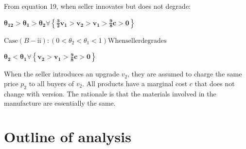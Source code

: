 \documentclass{article}
\begin{document}
From equation 19, when seller innovates but does not degrade: 

\begin{doublespace}
\noindent\(\pmb{\theta _{12}>\theta _1>\theta _2\forall \left\{\frac{3}{2} v_1>v_2>v_1>\frac{9}{8}c>0\right\}}\)
\end{doublespace}

\(\text{Case} (B-\text{ii}): \left(0<\theta _2<\theta _1<1\right)\text{When} \text{seller} \text{degrades}\)

\begin{doublespace}
\noindent\(\pmb{\theta _2<\theta _1\forall \left\{v_2>v_1>\frac{9}{8}c>0\right\}}\)
\end{doublespace}

When the seller introduces an upgrade \(v_2\), they are assumed to charge the same price \(p_2\) to all buyers of \(v_2\). All products have a marginal
cost \(c\) that does not change with version. The rationale is that the materials involved in the manufacture are essentially the same.

\section*{Outline of analysis}
\end{document}
